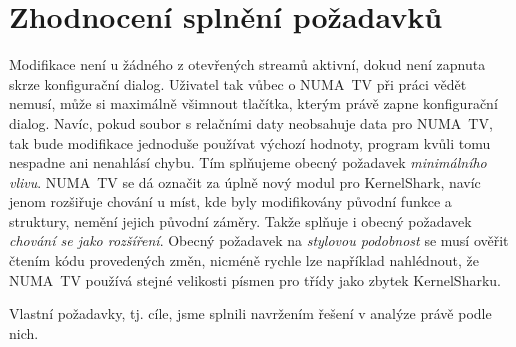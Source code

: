 \section{Zhodnocení splnění požadavků}
Modifikace není u žádného z otevřených streamů aktivní, dokud není zapnuta skrze konfigurační dialog. Uživatel tak vůbec o NUMA~TV při práci vědět nemusí, může si maximálně všimnout tlačítka, kterým právě zapne konfigurační dialog. Navíc, pokud soubor s relačními daty neobsahuje data pro NUMA~TV, tak bude modifikace jednoduše používat výchozí hodnoty, program kvůli tomu nespadne ani nenahlásí chybu. Tím splňujeme obecný požadavek \emph{minimálního vlivu}. NUMA~TV se dá označit za úplně nový modul pro KernelShark, navíc jenom rozšiřuje chování u míst, kde byly modifikovány původní funkce a struktury, nemění jejich původní záměry. Takže splňuje i obecný požadavek \emph{chování se jako rozšíření}. Obecný požadavek na \emph{stylovou podobnost} se musí ověřit čtením kódu provedených změn, nicméně rychle lze například nahlédnout, že NUMA~TV používá stejné velikosti písmen pro třídy jako zbytek KernelSharku.

Vlastní požadavky, tj. cíle, jsme splnili navržením řešení v analýze právě podle nich.